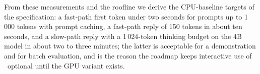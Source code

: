 From these measurements and the roofline we derive the CPU-baseline
targets of the specification: a fast-path first token under two seconds for
prompts up to 1\,000 tokens with prompt caching, a fast-path reply of 150
tokens in about ten seconds, and a slow-path reply with a 1\,024-token
thinking budget on the 4B model in about two to three minutes; the latter
is acceptable for a demonstration and for batch evaluation, and is the
reason the roadmap keeps interactive use of \Stwo\ optional until the GPU
variant exists.
